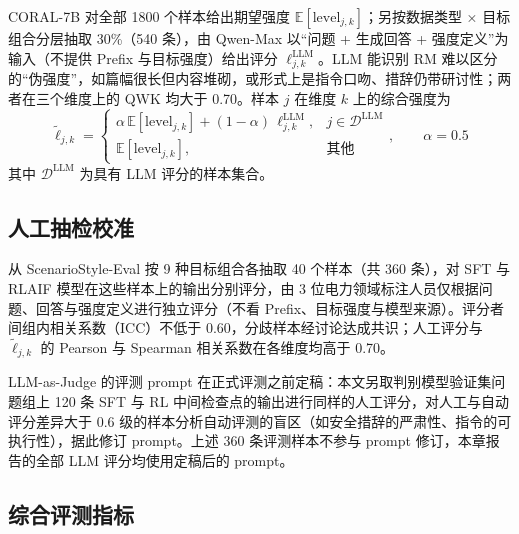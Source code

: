 \documentclass[fontset=fandol,type=master,campus=shenzhen,etitleauto=true]{hithesisbook}
\begin{document}
CORAL-7B 对全部 1800 个样本给出期望强度 $\mathbb{E}[\text{level}_{j,k}]$；另按数据类型 × 目标组合分层抽取 30\%（540 条），由 Qwen-Max 以“问题 + 生成回答 + 强度定义”为输入（不提供 Prefix 与目标强度）给出评分 $\ell^{\text{LLM}}_{j,k}$。LLM 能识别 RM 难以区分的“伪强度”，如篇幅很长但内容堆砌，或形式上是指令口吻、措辞仍带研讨性；两者在三个维度上的 QWK 均大于 0.70。样本 $j$ 在维度 $k$ 上的综合强度为
\begin{equation}\label{eq:fused-level}
\tilde{\ell}_{j,k} = \begin{cases} \alpha\, \mathbb{E}[\text{level}_{j,k}] + (1 - \alpha)\, \ell^{\text{LLM}}_{j,k}, & j \in \mathcal{D}^{\text{LLM}} \\ \mathbb{E}[\text{level}_{j,k}], & \text{其他} \end{cases}, \qquad \alpha = 0.5
\end{equation}
其中 $\mathcal{D}^{\text{LLM}}$ 为具有 LLM 评分的样本集合。

\subsection{人工抽检校准}\label{ux4ebaux5de5ux62bdux68c0ux6821ux51c6}

从 ScenarioStyle-Eval 按 9 种目标组合各抽取 40 个样本（共 360 条），对 SFT 与 RLAIF 模型在这些样本上的输出分别评分，由 3 位电力领域标注人员仅根据问题、回答与强度定义进行独立评分（不看 Prefix、目标强度与模型来源）。评分者间组内相关系数（ICC）\cite{ref76}不低于 0.60，分歧样本经讨论达成共识；人工评分与 $\tilde{\ell}_{j,k}$ 的 Pearson 与 Spearman 相关系数在各维度均高于 0.70。

LLM-as-Judge 的评测 prompt 在正式评测之前定稿：本文另取判别模型验证集问题组上 120 条 SFT 与 RL 中间检查点的输出进行同样的人工评分，对人工与自动评分差异大于 0.6 级的样本分析自动评测的盲区（如安全措辞的严肃性、指令的可执行性），据此修订 prompt。上述 360 条评测样本不参与 prompt 修订，本章报告的全部 LLM 评分均使用定稿后的 prompt。

\subsection{综合评测指标}\label{ux7efcux5408ux8bc4ux6d4bux6307ux6807}
\end{document}
